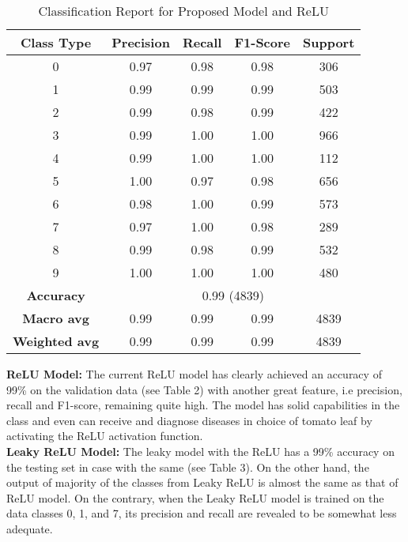 \documentclass[12pt, English]{article}
\begin{document}
\begin{normalsize}
\begin{table}[htbp]
  \centering
  \renewcommand{\thetable}{6.2}
  \caption{Classification Report for Proposed Model and ReLU}
  \label{tab:classification_relu}
  \begin{tabular}{|c|c|c|c|c|}
    \hline
    \textbf{Class Type} & \textbf{Precision} & \textbf{Recall} & \textbf{F1-Score} & \textbf{Support} \\
    \hline
    0 & 0.97 & 0.98 & 0.98 & 306 \\
    \hline
    1 & 0.99 & 0.99 & 0.99 & 503 \\
    \hline
    2 & 0.99 & 0.98 & 0.99 & 422 \\
    \hline
    3 & 0.99 & 1.00 & 1.00 & 966 \\
    \hline
    4 & 0.99 & 1.00 & 1.00 & 112 \\
    \hline
    5 & 1.00 & 0.97 & 0.98 & 656 \\
    \hline
    6 & 0.98 & 1.00 & 0.99 & 573 \\
    \hline
    7 & 0.97 & 1.00 & 0.98 & 289 \\
    \hline
    8 & 0.99 & 0.98 & 0.99 & 532 \\
    \hline
    9 & 1.00 & 1.00 & 1.00 & 480 \\
    \hline
    \textbf{Accuracy} & \multicolumn{4}{|c|}{0.99 (4839)} \\
    \hline
    \textbf{Macro avg} & 0.99 & 0.99 & 0.99 & 4839 \\
    \hline
    \textbf{Weighted avg} & 0.99 & 0.99 & 0.99 & 4839 \\
    \hline
  \end{tabular}
\end{table}

\textbf{ReLU Model:} The current ReLU model has clearly achieved an accuracy of 99\% on the validation data (see Table 2) with another great feature, i.e precision, recall and F1-score, remaining quite high. The model has solid capabilities in the class and even can receive and diagnose diseases in choice of tomato leaf by activating the ReLU activation function.
\\
\textbf{Leaky ReLU Model:} The leaky model with the ReLU has a 99\% accuracy on the testing set in case with the same (see Table 3). On the other hand, the output of majority of the classes from Leaky ReLU is almost the same as that of ReLU model. On the contrary, when the Leaky ReLU model is trained on the data classes 0, 1, and 7, its precision and recall are revealed to be somewhat less adequate.


\end{normalsize}
\end{document}
